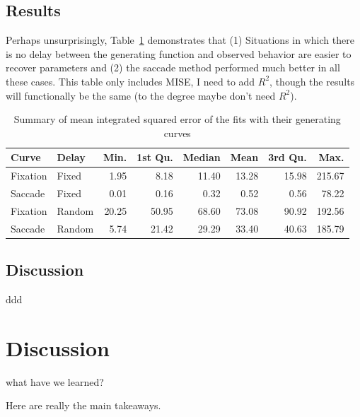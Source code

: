 \documentclass{article}
\begin{document}
\subsection{Results}

Perhaps unsurprisingly, Table~\ref{tab:mise_fixed_delay} demonstrates that (1) Situations in which there is no delay between the generating function and observed behavior are easier to recover parameters and (2) the saccade method performed much better in all these cases. This table only includes MISE, I need to add $R^2$, though the results will functionally be the same (to the degree maybe don't need $R^2$).

\begin{table}[ht]
\centering
\begin{tabular}{llrrrrrr}
  \hline
Curve & Delay & Min. & 1st Qu. & Median & Mean & 3rd Qu. & Max. \\ 
  \hline
Fixation & Fixed & 1.95 & 8.18 & 11.40 & 13.28 & 15.98 & 215.67 \\ 
  Saccade & Fixed & 0.01 & 0.16 & 0.32 & 0.52 & 0.56 & 78.22 \\ 
  Fixation & Random & 20.25 & 50.95 & 68.60 & 73.08 & 90.92 & 192.56 \\ 
  Saccade & Random & 5.74 & 21.42 & 29.29 & 33.40 & 40.63 & 185.79 \\ 
   \hline
\end{tabular}
\caption{Summary of mean integrated squared error of the fits with their generating curves}
\label{tab:mise_fixed_delay}
\end{table}

\subsection{Discussion}

ddd
\section{Discussion}

what have we learned?

Here are really the main takeaways.
\end{document}
